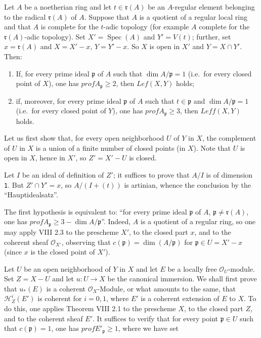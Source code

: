 \documentclass[
  11pt,
  a4paper,
]{book}
\providecommand{\tightlist}{%
  \setlength{\itemsep}{0pt}\setlength{\parskip}{0pt}}
\begin{document}
Let \(A\) be a noetherian ring and let \(t \in \mathfrak{r}(A)\) be an
\(A\)-regular element belonging to the radical \(\mathfrak{r}(A)\) of
\(A\). Suppose that \(A\) is a quotient of a regular local ring and that
\(A\) is complete for the \(t\)-adic topology (for example \(A\)
complete for the \(\mathfrak{r}(A)\)-adic topology). Set
\(X' = \operatorname{Spec}(A)\) and \(Y' = V(t)\); further, set
\(x = \mathfrak{r}(A)\) and \(X = X' - {x}\), \(Y = Y' - {x}\). So \(X\)
is open in \(X'\) and \(Y =
X \cap Y'\). Then:

\begin{enumerate}
\def\labelenumi{\arabic{enumi}.}
\tightlist
\item
  If, for every prime ideal \(\mathfrak{p}\) of \(A\) such that
  \(\dim A/\mathfrak{p} = 1\) (i.e.~for every closed point of \(X\)),
  one has \(prof A_{\mathfrak{p}} \geqslant 2\), then \(Lef(X, Y)\)
  holds;
\item
  if, moreover, for every prime ideal \(\mathfrak{p}\) of \(A\) such
  that \(t \in \mathfrak{p}\) and \(\dim A/\mathfrak{p} =
  1\) (i.e.~for every closed point of \(Y\)), one has
  \(prof A_{\mathfrak{p}} \geqslant 3\), then \(Leff(X, Y)\) holds.
\end{enumerate}

Let us first show that, for every open neighborhood \(U\) of \(Y\) in
\(X\), the complement of \(U\) in \(X\) is a union of a finite number of
closed points (in \(X\)). Note that \(U\) is open in \(X\), hence in
\(X'\), so \(Z' = X' - U\) is closed.

Let \(I\) be an ideal of definition of \(Z'\); it suffices to prove that
\(A/I\) is of dimension \texttt{1}. But \(Z' \cap Y' = {x}\), so
\(A/(I + (t))\) is artinian, whence the conclusion by the
``Hauptidealsatz''.

The first hypothesis is equivalent to: ``for every prime ideal
\(\mathfrak{p}\) of \(A\), \(\mathfrak{p} \neq
\mathfrak{r}(A)\), one has
\(prof A_{\mathfrak{p}} \geqslant 3 - \dim A/\mathfrak{p}\)''. Indeed,
\(A\) is a quotient of a regular ring, so one may apply VIII 2.3 to the
prescheme \(X'\), to the closed part \({x}\), and to the coherent sheaf
\(\mathcal{O}_{X'}\), observing that
\(c(\mathfrak{p}) = \dim(A/\mathfrak{p})\) for
\(\mathfrak{p} \in U = X' - {x}\) (since \(x\) is the closed point of
\(X'\)).

Let \(U\) be an open neighborhood of \(Y\) in \(X\) and let \(E\) be a
locally free \(\mathcal{O}_{U}\)-module. Set \(Z = X - U\) and let
\(u: U \to X\) be the canonical immersion. We shall first prove that
\(u_{*}(E)\) is a coherent \(\mathcal{O}_{X}\)-Module, or what amounts
to the same, that \(\mathcal{H}^{i}_{Z}(E')\) is coherent for
\(i = 0, 1\), where \(E'\) is a coherent extension of \(E\) to \(X\). To
do this, one applies Theorem VIII 2.1 to the prescheme \(X\), to the
closed part \(Z\), and to the coherent sheaf \(E'\). It suffices to
verify that for every point \(\mathfrak{p} \in U\) such that
\(c(\mathfrak{p}) = 1\), one has \(prof E'_{\mathfrak{p}} \geqslant 1\),
where we have set
\end{document}
